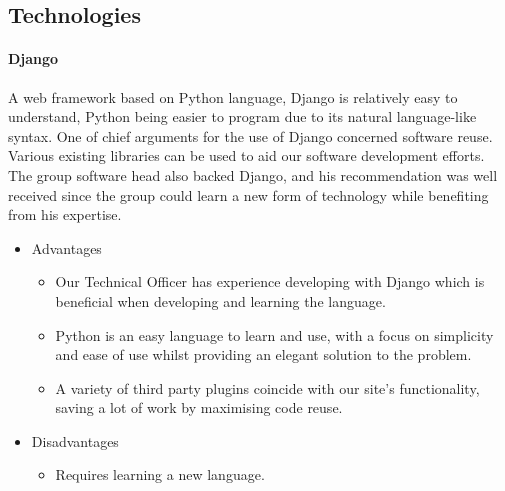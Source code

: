 \subsection{Technologies}

\paragraph{Django}
A web framework based on Python language, Django is relatively easy to understand, Python being easier to program due to its natural language-like syntax. One of chief arguments for the use of Django concerned software reuse. Various existing libraries can be used to aid our software development efforts. The group software head also backed Django, and his recommendation was well received since the group could learn a new form of technology while benefiting from his expertise.
\begin{itemize}
\item Advantages
	\begin{itemize}
	\item Our Technical Officer has experience developing with Django which is beneficial when developing and learning the language.
	\item Python is an easy language to learn and use, with a focus on simplicity and ease of use whilst providing an elegant solution to the problem.
	\item A variety of third party plugins coincide with our site's functionality, saving a lot of work by maximising code reuse.
	\end{itemize}
\item Disadvantages
	\begin{itemize}
	\item Requires learning a new language.
	\end{itemize}
\end{itemize}


